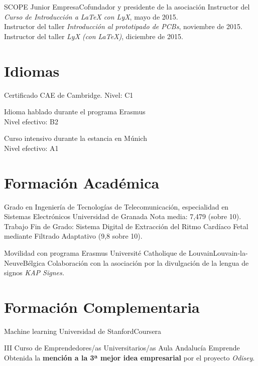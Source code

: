 \documentclass[11pt,a4paper,sans,spanish]{moderncv}
\begin{document}
{SCOPE Junior Empresa}{Cofundador y presidente de la asociación}{}{}
{Instructor del \emph{Curso de Introducción a LaTeX con LyX}, mayo de 2015.\\
Instructor del taller \emph{Introducción al prototipado de PCBs}, noviembre de 2015.\\
Instructor del taller \emph{LyX (con LaTeX)}, diciembre de 2015.
}


\section{Idiomas}


{Certificado CAE de Cambridge. Nivel: C1}

{Idioma hablado durante el programa Erasmus\\Nivel efectivo: B2}

{Curso intensivo durante la estancia en Múnich\\Nivel efectivo: A1} 


\section{Formación Académica}

{Grado en Ingeniería de Tecnologías de Telecomunicación, especialidad en Sistemas Electrónicos}
{Universidad de Granada}{}{}
{Nota media: 7,479 (sobre 10). 
Trabajo Fin de Grado: 
Sistema Digital de Extracción del Ritmo Cardíaco Fetal mediante Filtrado Adaptativo (9,8 sobre 10).}

{Movilidad con programa Erasmus}
{Université Catholique de Louvain}{Louvain-la-Neuve}{Bélgica}
{Colaboración con la asociación por la divulgación de la lengua de signos \emph{KAP Signes.}}


\section{Formación Complementaria}

{Machine learning}
{Universidad de Stanford}{Coursera}{}
{}

{III Curso de Emprendedores/as Universitarios/as}
{Aula Andalucía Emprende}{}{}
{Obtenida la \textbf{mención a la 3ª mejor idea empresarial} por el proyecto \emph{Odisey}. }
\end{document}
